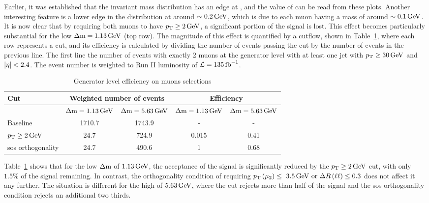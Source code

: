 Earlier, it was established that the invariant mass distribution has an edge at \dm, and the value of \dm can be read from these plots. Another interesting feature is a lower edge in the \dm distribution at around $\sim 0.2\,\text{Ge\hspace{-.08em}V}$, which is due to each muon having a mass of around $\sim 0.1\,\text{Ge\hspace{-.08em}V}$. It is now clear that by requiring both muons to have $p_{\mathrm{T}}\geq 2\,\text{Ge\hspace{-.08em}V}$, a significant portion of the signal is lost. This effect becomes particularly substantial for the low $\Delta\mathrm{m}=1.13\,\text{Ge\hspace{-.08em}V}$ (top row). The magnitude of this effect is quantified by a cutflow, shown in Table~\ref{tab:gen-muon-pt-dr-efficiency}, where each row represents a cut, and its efficiency is calculated by dividing the number of events passing the cut by the number of events in the previous line. The first line the number of events with exactly 2 muons at the generator level with at least one jet with $p_{\mathrm{T}} \geq 30\,\text{Ge\hspace{-.08em}V}$ and $\abs{\eta}<2.4$. The event number is weighted to Run II luminosity of $\mathcal{L} = 135 \mbox{\ensuremath{\,\text{fb}^{-1}}}$.

\begin{table}[!htb]
	\centering
	\label{tab:gen-muon-pt-dr-efficiency}
		\caption{Generator level efficiency on muons selections}
			\begin{tabular}{l|cc|cc} \hline
			Cut & \multicolumn{2}{c|}{Weighted number of events} & \multicolumn{2}{c}{Efficiency} \\ \hline
			
			 & $\Delta\mathrm{m}=1.13\,\text{Ge\hspace{-.08em}V}$ & $\Delta\mathrm{m}=5.63\,\text{Ge\hspace{-.08em}V}$ & $\Delta\mathrm{m}=1.13\,\text{Ge\hspace{-.08em}V}$ & $\Delta\mathrm{m}=5.63\,\text{Ge\hspace{-.08em}V}$ \\
			Baseline & 1710.7 & 1743.9 & - & -\\
			$p_{\mathrm{T}}\geq 2\,\text{Ge\hspace{-.08em}V}$ & 24.7 & 724.9 & 0.015 & 0.41\\
			\gls{sos} orthogonality & 24.7 & 490.6 & 1 & 0.68 \\ \hline
			\end{tabular}
\end{table}

Table~\ref{tab:gen-muon-pt-dr-efficiency} shows that for the low $\Delta\mathrm{m}$ of $1.13\,\text{Ge\hspace{-.08em}V}$, the acceptance of the signal is significantly reduced by the $p_{\mathrm{T}}\geq 2\,\text{Ge\hspace{-.08em}V}$ cut, with only $1.5\%$ of the signal remaining. In contrast, the orthogonality condition of requiring $p_{\mathrm{T}}\left(\mu_2\right)\leq~3.5\,\text{Ge\hspace{-.08em}V}\text{ or }\Delta R\left(\ell\ell\right)\leq 0.3$ does not affect it any further. The situation is different for the high \dm of $5.63\,\text{Ge\hspace{-.08em}V}$, where the \pt cut rejects more than half of the signal and the \gls{sos} orthogonality condition rejects an additional two thirds.

